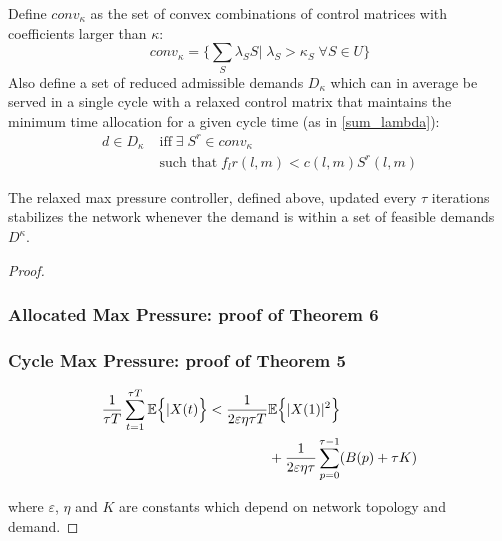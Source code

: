 Define $conv_{\kappa}$ as the set of convex combinations of control matrices with coefficients larger than $\kappa$:
\begin{equation}
conv_{\kappa} = \Big\{ \sum_{S}\lambda_{S}S \big| \; \lambda_S > \kappa_S \; \forall S\in U\Big\}
\end{equation}
Also define a set of reduced admissible demands $D_{\kappa}$ which can in average be served in a single cycle with a relaxed control matrix that maintains the minimum time allocation for a given cycle time (as in \eqref{sum_lambda}):
\begin{align} \nonumber
d \in D_{\kappa} \; & \text{iff} \; \exists \; S^r \in conv_{\kappa} \; \\ & \text{such that} \; f_{l}r(l,m) < c(l,m)S^r(l,m)
\label{admissible_relaxed}
\end{align} 

\vspace{0.5cm}


\begin{Thm}\label{stabRelaxMP}
The relaxed max pressure controller, defined above, updated every $\tau$ iterations stabilizes the network whenever the demand is within a set of feasible demands $D^{\kappa}$.
\end{Thm}

\begin{proof}



%
%
\subsubsection*{Allocated Max Pressure: proof of Theorem 6}

\subsubsection*{Cycle Max Pressure: proof of Theorem 5}




\begin{align} \label{CYCLE_BOUNDS}
\dfrac{1}{\tau T} \displaystyle\sum_{t=1}^{\tau T} \expectation{\vert X(t)}< \dfrac{1}{2\varepsilon\eta\tau T}& \expectation{\vert X(1) \vert^{2}} \\ \nonumber
& + \dfrac{1}{2\varepsilon\eta\tau}\displaystyle\sum_{p=0}^{\tau - 1} (B(p) + \tau K)
\end{align}

where $\varepsilon$, $\eta$ and $K$ are constants which depend on network topology and demand.

\end{proof}

